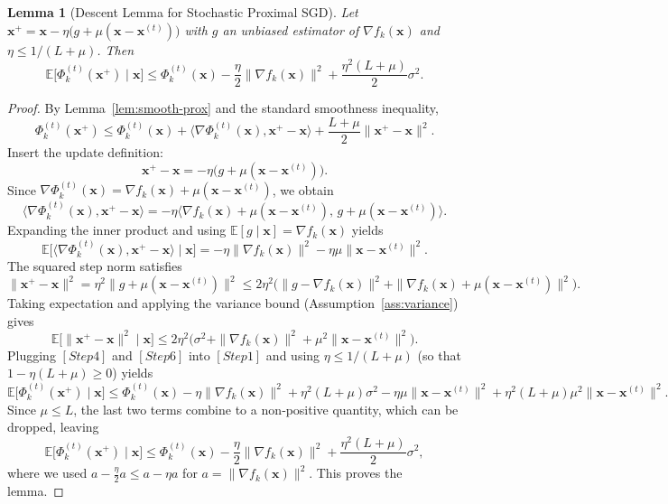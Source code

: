 \documentclass{article}
\newtheorem{lemma}{Lemma}
\newcommand{\E}{\mathbb{E}}
\begin{document}
\begin{lemma}[Descent Lemma for Stochastic Proximal SGD]\label{lem:descent}
Let $\mathbf{x}^{+}= \mathbf{x} -\eta\bigl(g+\mu(\mathbf{x}-\mathbf{x}^{(t)})\bigr)$ with $g$ an unbiased estimator of $\nabla f_k(\mathbf{x})$ and $\eta\le 1/(L+\mu)$. Then
\[
\E\bigl[\Phi_{k}^{(t)}(\mathbf{x}^{+})\mid\mathbf{x}\bigr]
\le
\Phi_{k}^{(t)}(\mathbf{x})
-\frac{\eta}{2}\|\nabla f_k(\mathbf{x})\|^{2}
+\frac{\eta^{2}(L+\mu)}{2}\sigma^{2}.
\tag{5}
\]
\end{lemma}
\begin{proof}
By Lemma~\ref{lem:smooth-prox} and the standard smoothness inequality,
\[
\Phi_{k}^{(t)}(\mathbf{x}^{+})
\le
\Phi_{k}^{(t)}(\mathbf{x})
+\langle\nabla\Phi_{k}^{(t)}(\mathbf{x}),\mathbf{x}^{+}-\mathbf{x}\rangle
+\frac{L+\mu}{2}\|\mathbf{x}^{+}-\mathbf{x}\|^{2}.
\tag*{[Step 1]}
\]
Insert the update definition:
\[
\mathbf{x}^{+}-\mathbf{x}
= -\eta\bigl(g+\mu(\mathbf{x}-\mathbf{x}^{(t)})\bigr).
\tag*{[Step 2]}
\]
Since $\nabla\Phi_{k}^{(t)}(\mathbf{x})=\nabla f_k(\mathbf{x})+\mu(\mathbf{x}-\mathbf{x}^{(t)})$, we obtain
\[
\langle\nabla\Phi_{k}^{(t)}(\mathbf{x}),\mathbf{x}^{+}-\mathbf{x}\rangle
=
-\eta\langle\nabla f_k(\mathbf{x})+\mu(\mathbf{x}-\mathbf{x}^{(t)}),\,g+\mu(\mathbf{x}-\mathbf{x}^{(t)})\rangle.
\tag*{[Step 3]}
\]
Expanding the inner product and using $\E[g\mid\mathbf{x}]=\nabla f_k(\mathbf{x})$ yields
\[
\E\bigl[\langle\nabla\Phi_{k}^{(t)}(\mathbf{x}),\mathbf{x}^{+}-\mathbf{x}\rangle\mid\mathbf{x}\bigr]
=
-\eta\|\nabla f_k(\mathbf{x})\|^{2}
-\eta\mu\|\mathbf{x}-\mathbf{x}^{(t)}\|^{2}.
\tag*{[Step 4]}
\]
The squared step norm satisfies
\[
\|\mathbf{x}^{+}-\mathbf{x}\|^{2}
= \eta^{2}\|g+\mu(\mathbf{x}-\mathbf{x}^{(t)})\|^{2}
\le 2\eta^{2}\bigl(\|g-\nabla f_k(\mathbf{x})\|^{2}
+\|\nabla f_k(\mathbf{x})+\mu(\mathbf{x}-\mathbf{x}^{(t)})\|^{2}\bigr).
\tag*{[Step 5]}
\]
Taking expectation and applying the variance bound (Assumption~\ref{ass:variance}) gives
\[
\E\bigl[\|\mathbf{x}^{+}-\mathbf{x}\|^{2}\mid\mathbf{x}\bigr]
\le 2\eta^{2}\bigl(\sigma^{2}+ \|\nabla f_k(\mathbf{x})\|^{2}+\mu^{2}\|\mathbf{x}-\mathbf{x}^{(t)}\|^{2}\bigr).
\tag*{[Step 6]}
\]
Plugging \([Step 4]\) and \([Step 6]\) into \([Step 1]\) and using $\eta\le 1/(L+\mu)$ (so that $1-\eta(L+\mu)\ge0$) yields
\[
\E\bigl[\Phi_{k}^{(t)}(\mathbf{x}^{+})\mid\mathbf{x}\bigr]
\le
\Phi_{k}^{(t)}(\mathbf{x})
-\eta\|\nabla f_k(\mathbf{x})\|^{2}
+\eta^{2}(L+\mu)\sigma^{2}
-\eta\mu\|\mathbf{x}-\mathbf{x}^{(t)}\|^{2}
+\eta^{2}(L+\mu)\mu^{2}\|\mathbf{x}-\mathbf{x}^{(t)}\|^{2}.
\tag*{[Step 7]}
\]
Since $\mu\le L$, the last two terms combine to a non‑positive quantity, which can be dropped, leaving
\[
\E\bigl[\Phi_{k}^{(t)}(\mathbf{x}^{+})\mid\mathbf{x}\bigr]
\le
\Phi_{k}^{(t)}(\mathbf{x})
-\frac{\eta}{2}\|\nabla f_k(\mathbf{x})\|^{2}
+\frac{\eta^{2}(L+\mu)}{2}\sigma^{2},
\tag*{[Step 8]}
\]
where we used $a-\frac{\eta}{2}a\le a-\eta a$ for $a=\|\nabla f_k(\mathbf{x})\|^{2}$. This proves the lemma.
\end{proof}
\end{document}
